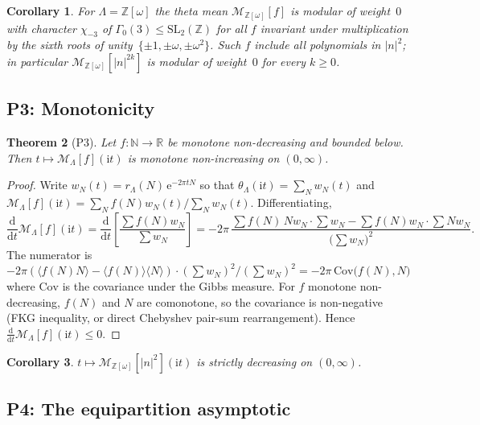 \documentclass[11pt,letterpaper]{article}
\theoremstyle{plain}
\newtheorem{theorem}{Theorem}[section]
\newtheorem{corollary}[theorem]{Corollary}
\theoremstyle{definition}
\newcommand{\Eisenstein}{\mathbb{Z}[\omega]}
\newcommand{\R}{\mathbb{R}}
\newcommand{\Z}{\mathbb{Z}}
\newcommand{\N}{\mathbb{N}}
\newcommand{\Lat}{\Lambda}
\newcommand{\tmean}[1]{\mathcal{M}_{\Lat}[#1]}
\newcommand{\tmeaneis}[1]{\mathcal{M}_{\Eisenstein}[#1]}
\newcommand{\e}{\mathrm{e}}
\begin{document}
\begin{corollary}
For $\Lat=\Eisenstein$ the theta mean $\tmeaneis{f}$ is modular of
weight~$0$ with character $\chi_{-3}$ of
$\Gamma_0(3)\le\mathrm{SL}_2(\Z)$ for all $f$ invariant under
multiplication by the sixth roots of unity~$\{\pm 1,\pm\omega,
\pm\omega^2\}$.  Such $f$ include all polynomials in $|n|^2$; in
particular $\tmeaneis{|n|^{2k}}$ is modular of weight~$0$ for
every $k\ge 0$.
\end{corollary}

\subsection{P3: Monotonicity}

\begin{theorem}[P3]\label{thm:P3}
Let $f\colon\N\to\R$ be monotone non-decreasing and bounded below.
Then $t\mapsto \tmean{f}(\mathrm{i} t)$ is monotone
non-\emph{increasing} on $(0,\infty)$.
\end{theorem}
\begin{proof}
Write $w_N(t) = r_\Lat(N)\,\e^{-2\pi t N}$ so that
$\theta_\Lat(\mathrm{i} t) = \sum_N w_N(t)$ and
$\tmean{f}(\mathrm{i} t) = \sum_N f(N) w_N(t)/\sum_N w_N(t)$.
Differentiating,
\[
\frac{\mathrm{d}}{\mathrm{d}t}\tmean{f}(\mathrm{i} t)
  = \frac{\mathrm{d}}{\mathrm{d}t}\!\left[\frac{\sum f(N) w_N}{\sum w_N}\right]
  = -2\pi\,\frac{\sum f(N)\,N w_N \cdot \sum w_N
                 - \sum f(N) w_N \cdot \sum N w_N}
              {\bigl(\sum w_N\bigr)^2}.
\]
The numerator is
$-2\pi\left(\langle f(N) N\rangle - \langle f(N)\rangle\langle
N\rangle\right)\cdot(\sum w_N)^2/(\sum w_N)^2
 = -2\pi\,\mathrm{Cov}\bigl(f(N),N\bigr)$
where $\mathrm{Cov}$ is the covariance under the Gibbs measure.  For
$f$ monotone non-decreasing, $f(N)$ and $N$ are comonotone, so the
covariance is non-negative (FKG inequality, or direct Chebyshev
pair-sum rearrangement).  Hence
$\frac{\mathrm{d}}{\mathrm{d}t}\tmean{f}(\mathrm{i} t) \le 0$.
\end{proof}

\begin{corollary}
$t\mapsto \tmeaneis{|n|^2}(\mathrm{i} t)$ is strictly decreasing on
$(0,\infty)$.
\end{corollary}

\subsection{P4: The equipartition asymptotic}
\end{document}
